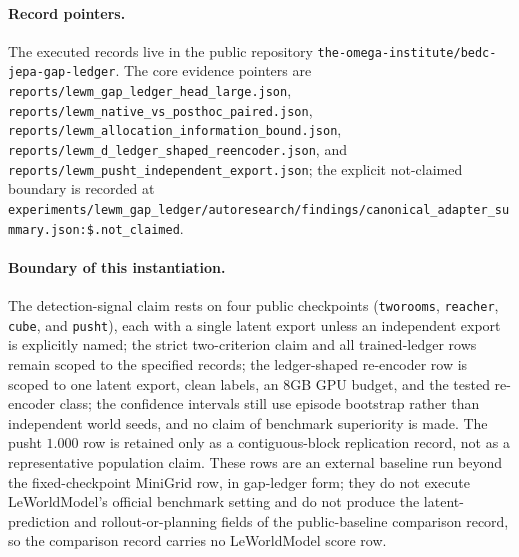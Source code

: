\paragraph{Record pointers.}
The executed records live in the public repository
\texttt{the-omega-institute/bedc-jepa-gap-ledger}.  The core evidence pointers
are
\texttt{reports/lewm\_gap\_ledger\_head\_large.json},
\texttt{reports/lewm\_native\_vs\_posthoc\_paired.json},
\texttt{reports/lewm\_allocation\_information\_bound.json},
\texttt{reports/lewm\_d\_ledger\_shaped\_reencoder.json}, and
\texttt{reports/lewm\_pusht\_independent\_export.json}; the explicit
not-claimed boundary is recorded at
\texttt{experiments/lewm\_gap\_ledger/autoresearch/findings/canonical\_adapter\_summary.json:\$.not\_claimed}.


\paragraph{Boundary of this instantiation.}
The detection-signal claim rests on four public checkpoints
(\texttt{tworooms}, \texttt{reacher}, \texttt{cube}, and \texttt{pusht}), each
with a single latent export unless an independent export is explicitly named;
the strict two-criterion claim and all trained-ledger rows remain scoped to the
specified records; the ledger-shaped re-encoder row is scoped to one latent
export, clean labels, an $8$GB GPU budget, and the tested re-encoder class; the
confidence intervals still use episode bootstrap rather than independent world
seeds, and no claim of benchmark superiority is made.
The pusht $1.000$ row is retained only as a contiguous-block replication record,
not as a representative population claim.  These rows are an external baseline
run beyond the fixed-checkpoint MiniGrid row, in gap-ledger form; they do not
execute LeWorldModel's official benchmark setting and do not produce the
latent-prediction and rollout-or-planning fields of the public-baseline
comparison record, so the comparison record carries no LeWorldModel score row.
